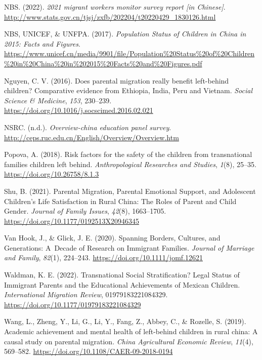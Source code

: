 \documentclass[
  man,floatsintext]{apa7}
\newlength{\cslhangindent}
\newlength{\cslentryspacingunit} %
\newenvironment{CSLReferences}[2] %
 {%
  \setlength{\parindent}{0pt}
  \ifodd #1
  \let\oldpar\par
  \def\par{\hangindent=\cslhangindent\oldpar}
  \fi
  \setlength{\parskip}{#2\cslentryspacingunit}
 }%
 {}
\begin{document}
\begin{CSLReferences}{1}{0}
\leavevmode{}%
NBS. (2022). \emph{2021 migrant workers monitor survey report {[}in Chinese{]}}. \url{http://www.stats.gov.cn/tjsj/zxfb/202204/t20220429_1830126.html}

\leavevmode{}%
NBS, UNICEF, \& UNFPA. (2017). \emph{Population Status of Children in China in 2015: Facts and Figures}. \url{https://www.unicef.cn/media/9901/file/Population\%20Status\%20of\%20Children\%20in\%20China\%20in\%202015\%20Facts\%20and\%20Figures.pdf}

\leavevmode{}%
Nguyen, C. V. (2016). Does parental migration really benefit left-behind children? Comparative evidence from Ethiopia, India, Peru and Vietnam. \emph{Social Science \& Medicine}, \emph{153}, 230--239. \url{https://doi.org/10.1016/j.socscimed.2016.02.021}

\leavevmode{}%
NSRC. (n.d.). \emph{Overview-china education panel survey}. \url{http://ceps.ruc.edu.cn/English/Overview/Overview.htm}

\leavevmode{}%
Popova, A. (2018). Risk factors for the safety of the children from transnational families children left behind. \emph{Anthropological Researches and Studies}, \emph{1}(8), 25--35. \url{https://doi.org/10.26758/8.1.3}

\leavevmode{}%
Shu, B. (2021). Parental Migration, Parental Emotional Support, and Adolescent Children{'}s Life Satisfaction in Rural China: The Roles of Parent and Child Gender. \emph{Journal of Family Issues}, \emph{42}(8), 1663--1705. \url{https://doi.org/10.1177/0192513X20946345}

\leavevmode{}%
Van Hook, J., \& Glick, J. E. (2020). Spanning Borders, Cultures, and Generations: A~Decade of Research on Immigrant Families. \emph{Journal of Marriage and Family}, \emph{82}(1), 224--243. \url{https://doi.org/10.1111/jomf.12621}

\leavevmode{}%
Waldman, K. E. (2022). Transnational Social Stratification? Legal Status of Immigrant Parents and the Educational Achievements of Mexican Children. \emph{International Migration Review}, 01979183221084329. \url{https://doi.org/10.1177/01979183221084329}

\leavevmode{}%
Wang, L., Zheng, Y., Li, G., Li, Y., Fang, Z., Abbey, C., \& Rozelle, S. (2019). Academic achievement and mental health of left-behind children in rural china: A causal study on parental migration. \emph{China Agricultural Economic Review}, \emph{11}(4), 569--582. \url{https://doi.org/10.1108/CAER-09-2018-0194}


\end{CSLReferences}
\end{document}

